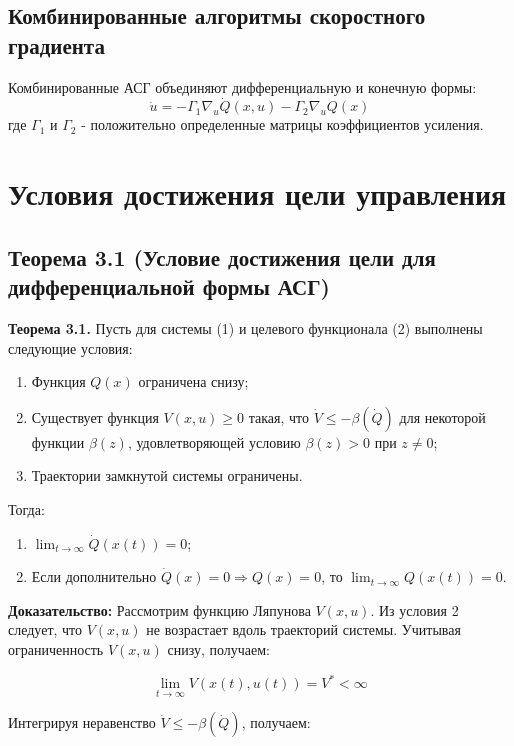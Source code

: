 \documentclass[14pt,a4paper]{article}
\begin{document}
\subsection{Комбинированные алгоритмы скоростного градиента}
Комбинированные АСГ объединяют дифференциальную и конечную формы:
\begin{equation}
    \dot{u} = -\Gamma_1 \nabla_u \dot{Q}(x,u) - \Gamma_2 \nabla_u Q(x)
\end{equation}
где $\Gamma_1$ и $\Gamma_2$ - положительно определенные матрицы коэффициентов усиления.

\section{Условия достижения цели управления}

\subsection{Теорема 3.1 (Условие достижения цели для дифференциальной формы АСГ)}
\textbf{Теорема 3.1.} Пусть для системы (1) и целевого функционала (2) выполнены следующие условия:
\begin{enumerate}
    \item Функция $Q(x)$ ограничена снизу;
    \item Существует функция $V(x,u) \geq 0$ такая, что $\dot{V} \leq -\beta(\dot{Q})$ для некоторой функции $\beta(z)$, удовлетворяющей условию $\beta(z) > 0$ при $z \neq 0$;
    \item Траектории замкнутой системы ограничены.
\end{enumerate}
Тогда:
\begin{enumerate}
    \item $\lim_{t \to \infty} \dot{Q}(x(t)) = 0$;
    \item Если дополнительно $\dot{Q}(x) = 0 \Rightarrow Q(x) = 0$, то $\lim_{t \to \infty} Q(x(t)) = 0$.
\end{enumerate}

\textbf{Доказательство:}
Рассмотрим функцию Ляпунова $V(x,u)$. Из условия 2 следует, что $V(x,u)$ не возрастает вдоль траекторий системы. Учитывая ограниченность $V(x,u)$ снизу, получаем:

\begin{equation}
    \lim_{t \to \infty} V(x(t),u(t)) = V^* < \infty
\end{equation}

Интегрируя неравенство $\dot{V} \leq -\beta(\dot{Q})$, получаем:
\end{document}

